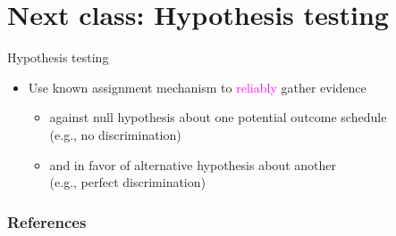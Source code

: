 \documentclass[table, xcolor = {dvipsnames}, 9pt]{beamer}
\theoremstyle{plain}
\begin{document}
\section{Next class: Hypothesis testing}
\begin{frame}{Hypothesis testing}
\vfill
\begin{itemize} \vfill
\item Use known assignment mechanism to \textcolor{magenta}{reliably} gather evidence \vfill
\begin{itemize} \vfill
\item against null hypothesis about one potential outcome schedule \\ (e.g., no discrimination) \vfill
\item and in favor of alternative hypothesis about another \\ (e.g., perfect discrimination) \vfill
\end{itemize} \vfill
\end{itemize} \vfill
\end{frame}

\begin{frame}
\frametitle{References} 
\scriptsize

\end{frame}
\end{document}
